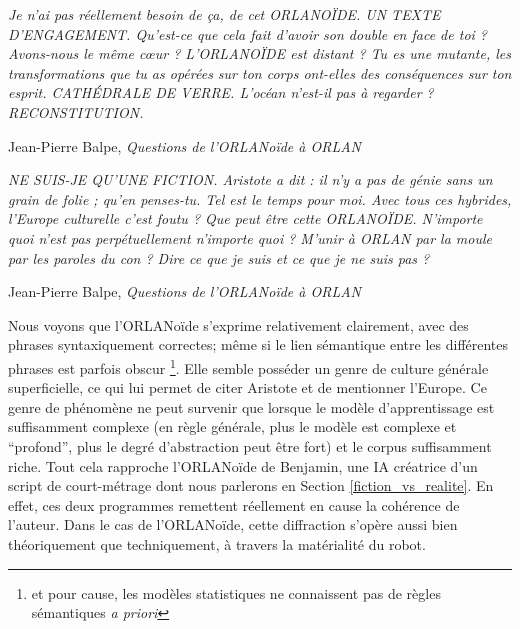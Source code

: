 \documentclass{article}
\newenvironment{citationbox}
{\begin{center}
		\begin{minipage}{.8\textwidth}
		}
		{
		\end{minipage}	
\end{center}
}
\begin{document}
				\begin{citationbox}
					\textit{Je n'ai pas réellement besoin de ça, de cet ORLANOÏDE. UN TEXTE D’ENGAGEMENT. Qu'est-ce que cela fait d’avoir son double en face de toi ? Avons-nous le même cœur ? L'ORLANOÏDE est distant ? Tu es une mutante, les transformations que tu as opérées sur ton corps ont-elles des conséquences sur ton esprit. CATHÉDRALE DE VERRE. L'océan n'est-il pas à regarder ? RECONSTITUTION.}
					\begin{flushright}
						Jean-Pierre Balpe, \textit{Questions de l'ORLANoïde à ORLAN} \cite{balpe_site}
					\end{flushright}
				\end{citationbox}
				\begin{citationbox}
					\textit{NE SUIS-JE QU'UNE FICTION. Aristote a dit : il n'y a pas de génie sans un grain de folie ; qu’en penses-tu. Tel est le temps pour moi. Avec tous ces hybrides, l’Europe culturelle c'est foutu ? Que peut être cette ORLANOÏDE. N'importe quoi n'est pas perpétuellement n'importe quoi ? M'unir à ORLAN par la moule par les paroles du con ? Dire ce que je suis et ce que je ne suis pas ?}
					\begin{flushright}
						Jean-Pierre Balpe, \textit{Questions de l'ORLANoïde à ORLAN} \cite{balpe_site}
					\end{flushright}
				\end{citationbox}
				Nous voyons que l'ORLANoïde s'exprime relativement clairement, avec des phrases syntaxiquement correctes; même si le lien sémantique entre les différentes phrases est parfois obscur \footnote{et pour cause, les modèles statistiques ne connaissent pas de règles sémantiques \textit{a priori}}. Elle semble posséder un genre de culture générale superficielle, ce qui lui permet de citer Aristote et de mentionner l'Europe. Ce genre de phénomène ne peut survenir que lorsque le modèle d'apprentissage est suffisamment complexe (en règle générale, plus le modèle est complexe et ``profond'', plus le degré d'abstraction peut être fort) et le corpus suffisamment riche. Tout cela rapproche l'ORLANoïde de Benjamin, une IA créatrice d'un script de court-métrage dont nous parlerons en Section \ref{fiction_vs_realite}. En effet, ces deux programmes remettent réellement en cause la cohérence de l'auteur. Dans le cas de l'ORLANoïde, cette diffraction s'opère aussi bien théoriquement que techniquement, à travers la matérialité du robot.
				
\end{document}
